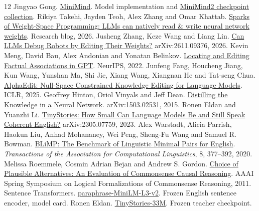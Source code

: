 \documentclass[11pt]{article}
\begin{document}
\begin{thebibliography}{12}\small
{} Jingyao Gong. \href{https://github.com/jingyaogong/minimind}{MiniMind}. Model implementation and \href{https://huggingface.co/jingyaogong/MiniMind2}{MiniMind2 checkpoint collection}.
 Rikiya Takehi, Jayden Teoh, Alex Zhang and Omar Khattab. \href{https://rikiyat.github.io/blog/weight-space-programming/}{Sparks of Weight-Space Programming: LLMs can natively read \& write neural network weights}. Research blog, 2026.
 Jusheng Zhang, Keze Wang and Liang Lin. \href{https://arxiv.org/abs/2611.09376}{Can LLMs Debug Robots by Editing Their Weights?} arXiv:2611.09376, 2026.
 Kevin Meng, David Bau, Alex Andonian and Yonatan Belinkov. \href{https://arxiv.org/abs/2202.05262}{Locating and Editing Factual Associations in GPT}. NeurIPS, 2022.
 Junfeng Fang, Houcheng Jiang, Kun Wang, Yunshan Ma, Shi Jie, Xiang Wang, Xiangnan He and Tat-seng Chua. \href{https://arxiv.org/abs/2410.02355}{AlphaEdit: Null-Space Constrained Knowledge Editing for Language Models}. ICLR, 2025.
 Geoffrey Hinton, Oriol Vinyals and Jeff Dean. \href{https://arxiv.org/abs/1503.02531}{Distilling the Knowledge in a Neural Network}. arXiv:1503.02531, 2015.
 Ronen Eldan and Yuanzhi Li. \href{https://arxiv.org/abs/2305.07759}{TinyStories: How Small Can Language Models Be and Still Speak Coherent English?} arXiv:2305.07759, 2023.
 Alex Warstadt, Alicia Parrish, Haokun Liu, Anhad Mohananey, Wei Peng, Sheng-Fu Wang and Samuel R. Bowman. \href{https://doi.org/10.1162/tacl_a_00321}{BLiMP: The Benchmark of Linguistic Minimal Pairs for English}. \emph{Transactions of the Association for Computational Linguistics}, 8, 377--392, 2020.
 Melissa Roemmele, Cosmin Adrian Bejan and Andrew S. Gordon. \href{https://asgordon.github.io/copa.html}{Choice of Plausible Alternatives: An Evaluation of Commonsense Causal Reasoning}. AAAI Spring Symposium on Logical Formalizations of Commonsense Reasoning, 2011.
 Sentence Transformers. \href{https://huggingface.co/sentence-transformers/paraphrase-MiniLM-L3-v2}{paraphrase-MiniLM-L3-v2}. Frozen English sentence encoder, model card.
 Ronen Eldan. \href{https://huggingface.co/roneneldan/TinyStories-33M/tree/2ad0a164221b7c4d21cac7c46aec74f6f98dbfc8}{TinyStories-33M}. Frozen teacher checkpoint.
\end{thebibliography}
\end{document}
